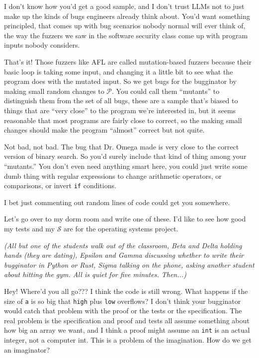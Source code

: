 \documentclass[sigplan]{acmart}
\begin{document}
  I don't know how you'd get a good sample,
and I don't trust LLMs not to just make up the kinds of bugs engineers
already think about.  You'd want something principled, that comes up
with bug scenarios nobody normal will ever think of, the way the
fuzzers we saw in the software security class
come up with program inputs nobody considers.

  That's it!  Those fuzzers like AFL are
called mutation-based fuzzers because their basic loop is taking some
input, and changing it a little bit to see what the program does with
the mutated input.  So we get bugs for the bugginator by making small
random changes to $\mathcal{P}$.  You could call them ``mutants'' to
distinguish them from the set of all bugs, these are a sample that's
biased to things that are ``very close'' to the program we're
interested in, but it seems reasonable that most programs are fairly
close to correct, so the making small changes should make the program
``almost'' correct but not quite.

   Not bad, not bad.  The bug that Dr. Omega
made is very close to the correct version of binary search.  So you'd
surely include that kind of thing among your ``mutants.''   You don't
even need anything smart here, you could just write some dumb thing
with regular expressions to change arithmetic operators, or
comparisons, or invert {\tt if} conditions.

  I bet just commenting out random lines
of code could get you somewhere.

 Let's go over to my dorm room and write
one of these.  I'd like to see how good my tests and my $\mathcal{S}$
are for the operating systems project.


\vspace{0.1in}

\emph{(All but one of the students walk out of the classroom, Beta and Delta holding
  hands (they are dating), Epsilon and Gamma discussing whether to
  write their bugginator in Python or Rust, Sigma talking on the
  phone, asking another student about hitting the gym. All is quiet
  for five minutes.  Then...)}

\vspace{0.1in}

  Hey!  Where'd you all go??? I think the code is still
wrong.  What happens if the size of {\tt a} is so big that {\tt high}
plus {\tt low} overflows?  I don't think your bugginator would catch
that problem with the proof or the tests or the specification.  The
real problem is the specification and proof and tests all assume
something about how big an array we want, and I think a proof might
assume an {\tt int} is an actual integer, not a computer int.  This is a problem
of the imagination.  How do we get an imaginator?
\end{document}
